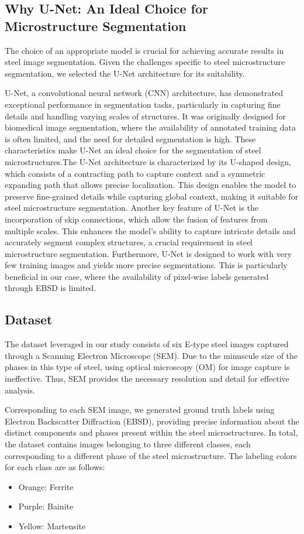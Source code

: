 \documentclass[]{article}
\begin{document}
\subsection{Why U-Net: An Ideal Choice for Microstructure Segmentation}

The choice of an appropriate model is crucial for achieving accurate results in steel image segmentation. Given the challenges specific to steel microstructure segmentation, we selected the U-Net architecture \cite{ronneberger2015unet} for its suitability.

U-Net, a convolutional neural network (CNN) architecture, has demonstrated exceptional performance in segmentation tasks, particularly in capturing fine details and handling varying scales of structures. It was originally designed for biomedical image segmentation, where the availability of annotated training data is often limited, and the need for detailed segmentation is high. These characteristics make U-Net an ideal choice for the segmentation of steel microstructures.The U-Net architecture is characterized by its U-shaped design, which consists of a contracting path to capture context and a symmetric expanding path that allows precise localization. This design enables the model to preserve fine-grained details while capturing global context, making it suitable for steel microstructure segmentation. Another key feature of U-Net is the incorporation of skip connections, which allow the fusion of features from multiple scales. This enhances the model's ability to capture intricate details and accurately segment complex structures, a crucial requirement in steel microstructure segmentation.
Furthermore, U-Net is designed to work with very few training images and yields more precise segmentations. This is particularly beneficial in our case, where the availability of pixel-wise labels generated through EBSD is limited.

\subsection{Dataset}

The dataset leveraged in our study consists of six E-type steel images captured through a Scanning Electron Microscope (SEM). Due to the minuscule size of the phases in this type of steel, using optical microscopy (OM) for image capture is ineffective. Thus, SEM provides the necessary resolution and detail for effective analysis.

Corresponding to each SEM image, we generated ground truth labels using Electron Backscatter Diffraction (EBSD), providing precise information about the distinct components and phases present within the steel microstructures. In total, the dataset contains images belonging to three different classes, each corresponding to a different phase of the steel microstructure. The labeling colors for each class are as follows:
\begin{itemize}
	\item Orange: Ferrite
	\item Purple: Bainite
	\item Yellow: Martensite
\end{itemize}
\end{document}
